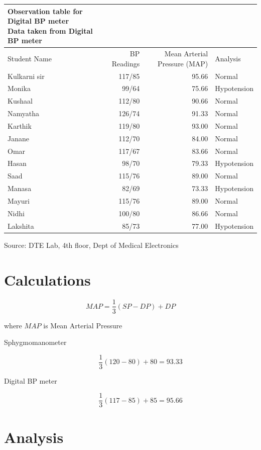 \documentclass[
  11pt,
  letterpaper,
  DIV=11,
  numbers=noendperiod]{scrreprt}
\begin{document}
\setlength{\LTpost}{0mm}
\begin{longtable*}{lrrl}
\caption*{
{\large Observation table for Digital BP meter} \\ 
{\small Data taken from Digital BP meter}
} \\ 
\toprule
Student Name & BP Readings & Mean Arterial Pressure (MAP) & Analysis \\ 
\midrule\addlinespace[2.5pt]
Kulkarni sir & 117/85 & 95.66 & Normal \\ 
Monika & 99/64 & 75.66 & Hypotension \\ 
Kushaal & 112/80 & 90.66 & Normal \\ 
Namyatha & 126/74 & 91.33 & Normal \\ 
Karthik & 119/80 & 93.00 & Normal \\ 
Janane & 112/70 & 84.00 & Normal \\ 
Omar & 117/67 & 83.66 & Normal \\ 
Hasan & 98/70 & 79.33 & Hypotension \\ 
Saad & 115/76 & 89.00 & Normal \\ 
Manasa & 82/69 & 73.33 & Hypotension \\ 
Mayuri & 115/76 & 89.00 & Normal \\ 
Nidhi & 100/80 & 86.66 & Normal \\ 
Lakshita & 85/73 & 77.00 & Hypotension \\ 
\bottomrule
\end{longtable*}
\begin{minipage}{\linewidth}
Source: DTE Lab, 4th floor, Dept of Medical Electronics\\
\end{minipage}

\section{Calculations}\label{calculations}

\[
MAP = \frac{1}{3} (SP - DP) + DP
\]

where \(MAP\) is Mean Arterial Pressure

\begin{description}
\item[Sphygmomanometer]
\[
\frac{1}{3} (120 - 80) + 80 = 93.33
\]
\item[Digital BP meter]
\[
\frac{1}{3} (117 - 85) + 85 = 95.66
\]
\end{description}

\section{Analysis}\label{analysis}
\end{document}
